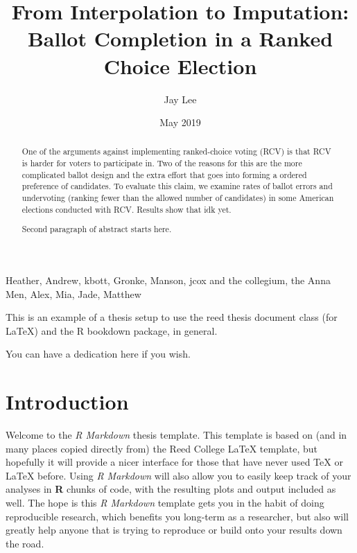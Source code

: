 \documentclass[12pt,twoside]{reedthesis}
\title{From Interpolation to Imputation: Ballot Completion in a Ranked Choice
Election}
\author{Jay Lee}
\date{May 2019}
\theoremstyle{definition}
\theoremstyle{definition}
\theoremstyle{definition}
\theoremstyle{remark}
\begin{document}
  \maketitle

\frontmatter %
\pagestyle{empty} %
  \begin{acknowledgements}
    Heather, Andrew, kbott, Gronke, Manson, jcox and the collegium, the Anna
    Men, Alex, Mia, Jade, Matthew
  \end{acknowledgements}
  \begin{preface}
    This is an example of a thesis setup to use the reed thesis document
    class (for LaTeX) and the R bookdown package, in general.
  \end{preface}
  \hypersetup{linkcolor=black}
  \setcounter{tocdepth}{2}
  \tableofcontents

  \listoftables

  \listoffigures
  \begin{abstract}
    One of the arguments against implementing ranked-choice voting (RCV) is
    that RCV is harder for voters to participate in. Two of the reasons for
    this are the more complicated ballot design and the extra effort that
    goes into forming a ordered preference of candidates. To evaluate this
    claim, we examine rates of ballot errors and undervoting (ranking fewer
    than the allowed number of candidates) in some American elections
    conducted with RCV. Results show that idk yet.
    
    \par
    
    Second paragraph of abstract starts here.
  \end{abstract}
  \begin{dedication}
    You can have a dedication here if you wish.
  \end{dedication}
\mainmatter %
\pagestyle{fancyplain} %

\hypertarget{introduction}{%
\chapter*{Introduction}\label{introduction}}

Welcome to the \emph{R Markdown} thesis template. This template is based
on (and in many places copied directly from) the Reed College LaTeX
template, but hopefully it will provide a nicer interface for those that
have never used TeX or LaTeX before. Using \emph{R Markdown} will also
allow you to easily keep track of your analyses in \textbf{R} chunks of
code, with the resulting plots and output included as well. The hope is
this \emph{R Markdown} template gets you in the habit of doing
reproducible research, which benefits you long-term as a researcher, but
also will greatly help anyone that is trying to reproduce or build onto
your results down the road.
\end{document}
